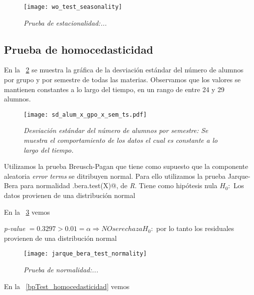\begin{figure}[H]
\centering
\texttt{[image: wo\_test\_seasonality]} %
\caption[\textit{Prueba de estacionalidad}]{\textit{Prueba de estacionalidad:...}}\label{WO_test_seasonality}
\end{figure}




\subsection{Prueba de homocedasticidad}


En la \figurename{~\ref{sd_alum_x_gpo_x_sem_ts}} se muestra la gráfica de la desviación estándar del número de alumnos por grupo y por semestre de todas las materias. Observamos que los valores se mantienen constantes a lo largo del tiempo, en un rango de entre 24 y 29 alumnos.


\begin{figure}[H]
\centering
\texttt{[image: sd\_alum\_x\_gpo\_x\_sem\_ts.pdf]} %
\caption[\textit{Desviación estándar del número de alumnos por semestre}]{\textit{Desviación estándar del número de alumnos por semestre: Se muestra el comportamiento de los datos el cual es constante a lo largo del tiempo.}}\label{sd_alum_x_gpo_x_sem_ts}
\end{figure}



Utilizamos la prueba Breusch-Pagan que tiene como supuesto que la componente aleatoria \textit{error terms} se ditribuyen normal. Para ello utilizamos la prueba Jarque-Bera para normalidad \verb@jarque.bera.test(X)@, de \textit{R}. Tiene como hipótesis nula $H_{0}:$ Los datos provienen de una distribución normal


En la \figurename{~\ref{JarqueBeraTest_normality}} vemos

\textit{p-value} $= 0.3297 > 0.01 = \alpha \Rightarrow NO se rechaza H_{0}:$ por lo tanto los residuales provienen de una distribución normal

\begin{figure}[H]
\centering
\texttt{[image: jarque\_bera\_test\_normality]} %
\caption[\textit{Prueba de normalidad}]{\textit{Prueba de normalidad:...}}\label{JarqueBeraTest_normality}
\end{figure}




En la \figurename{~\ref{bpTest_homocedasticidad}} vemos

